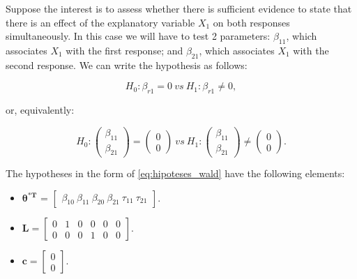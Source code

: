 \documentclass[article]{jss}\usepackage[]{graphicx}\usepackage[]{xcolor}
\begin{document}
Suppose the interest is to assess whether there is sufficient evidence to state that there is an effect of the explanatory variable $X_1$ on both responses simultaneously. In this case we will have to test 2 parameters: $\beta_{11}$, which associates $X_1$ with the first response; and $\beta_{21}$, which associates $X_1$ with the second response. We can write the hypothesis as follows:

\begin{equation}
\label{eq:ex2}
H_0: \beta_{r1} = 0 \ vs \ H_1: \beta_{r1} \neq 0,
\end{equation}

\noindent or, equivalently:

$$
H_0: 
\begin{pmatrix}
\beta_{11} \\ 
\beta_{21}
\end{pmatrix} 
= 
\begin{pmatrix}
0 \\ 
0
\end{pmatrix}
\ vs \ 
H_1: 
\begin{pmatrix}
\beta_{11} \\ 
\beta_{21}
\end{pmatrix} 
\neq
\begin{pmatrix}
0 \\ 
0 
\end{pmatrix}.
$$

The hypotheses in the form of \autoref{eq:hipoteses_wald} have the following elements:

\begin{itemize}
  
  \item $\boldsymbol{\theta^{*T}}$ = $\begin{bmatrix} \beta_{10} \  \beta_{11} \ \beta_{20} \ \beta_{21} \ \tau_{11} \ \tau_{21} \end{bmatrix}$.


\item $\boldsymbol{L} = \begin{bmatrix} 0 & 1 & 0 & 0 & 0 & 0 \\
0 & 0 & 0 & 1 & 0 & 0 \end{bmatrix}.$
 
\item $\boldsymbol{c} = \begin{bmatrix} 0 \\ 0 \end{bmatrix}.$ 

\end{itemize}
\end{document}
